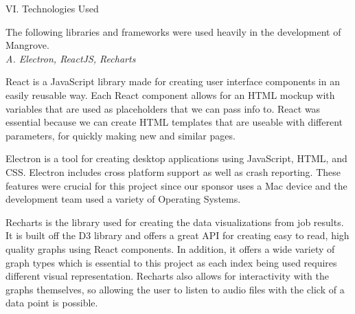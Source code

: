 \begin{center}
VI. Technologies Used
\end{center}
\begin{flushleft}
  \setlength{\parindent}{0.125in}
The following libraries and frameworks were used heavily in the development of Mangrove.\\

\noindent\textit{A. Electron, ReactJS, Recharts}\par
React is a JavaScript library made for creating user interface components in an easily reusable way. Each React component allows for an HTML mockup with variables that are used as placeholders that we can pass info to. React was essential because we can create HTML templates that are useable with different parameters, for quickly making new and similar pages.\par
Electron is a tool for creating desktop applications using JavaScript, HTML, and CSS. Electron includes cross platform support as well as crash reporting. These features were crucial for this project since our sponsor uses a Mac device and the development team used a variety of Operating Systems.\par
Recharts is the library used for creating the data visualizations from job results. It is built off the D3 library and offers a great API for creating easy to read, high quality graphs using React components. In addition, it offers a wide variety of graph types which is essential to this project as each index being used requires different visual representation. Recharts also allows for interactivity with the graphs themselves, so allowing the user to listen to audio files with the click of a data point is possible.\par


\end{flushleft}
